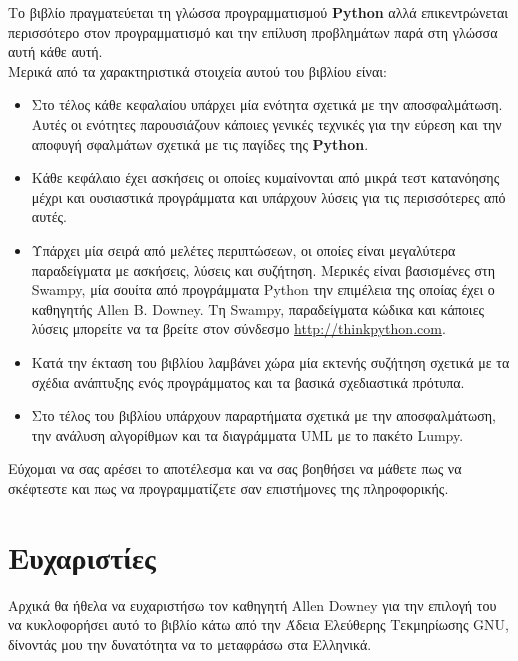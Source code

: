 \documentclass[10pt]{book}
\begin{document}
Το βιβλίο πραγματεύεται τη γλώσσα προγραμματισμού {\bf Python} αλλά επικεντρώνεται περισσότερο στον προγραμματισμό και την επίλυση προβλημάτων παρά στη γλώσσα αυτή κάθε αυτή.\\

Μερικά από τα χαρακτηριστικά στοιχεία αυτού του βιβλίου είναι:

\begin{itemize}

\item Στο τέλος κάθε κεφαλαίου υπάρχει μία ενότητα σχετικά με την αποσφαλμάτωση. Αυτές οι ενότητες παρουσιάζουν κάποιες γενικές τεχνικές για την εύρεση και την αποφυγή σφαλμάτων σχετικά με τις παγίδες της {\bf Python}.

\item Κάθε κεφάλαιο έχει ασκήσεις οι οποίες κυμαίνονται από μικρά 
  τεστ κατανόησης μέχρι και ουσιαστικά προγράμματα και 
  υπάρχουν λύσεις για τις περισσότερες από αυτές.

\item Υπάρχει μία σειρά από μελέτες περιπτώσεων, οι οποίες είναι
  μεγαλύτερα παραδείγματα με ασκήσεις, λύσεις και συζήτηση. Μερικές είναι 
  βασισμένες στη Swampy, μία σουίτα από προγράμματα Python την επιμέλεια 
  της οποίας έχει ο καθηγητής Allen B. Downey. Τη Swampy, παραδείγματα 
  κώδικα και κάποιες λύσεις μπορείτε να τα βρείτε στον σύνδεσμο 
  \url{http://thinkpython.com}.
  
\item Κατά την έκταση του βιβλίου λαμβάνει χώρα μία εκτενής συζήτηση 
  σχετικά με τα σχέδια ανάπτυξης ενός προγράμματος και τα βασικά 
  σχεδιαστικά πρότυπα.

\item Στο τέλος του βιβλίου υπάρχουν παραρτήματα σχετικά με την αποσφαλμάτωση,
  την ανάλυση αλγορίθμων και τα διαγράμματα UML με το πακέτο Lumpy.

\end{itemize}

Εύχομαι να σας αρέσει το αποτέλεσμα και να σας βοηθήσει να μάθετε πως να σκέφτεστε και πως να προγραμματίζετε σαν επιστήμονες της πληροφορικής.


\section*{Ευχαριστίες}

Αρχικά θα ήθελα να ευχαριστήσω τον καθηγητή Allen Downey για την επιλογή του να κυκλοφορήσει αυτό το βιβλίο κάτω από την Άδεια Ελεύθερης Τεκμηρίωσης GNU, 
δίνοντάς μου την δυνατότητα να το μεταφράσω στα Ελληνικά.
\end{document}
